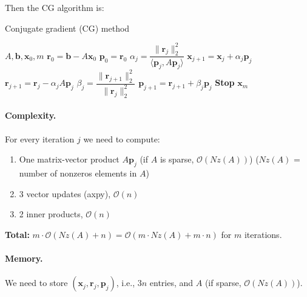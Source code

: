 Then the CG algorithm is:
\begin{algorithm}[H]
    \caption{Conjugate gradient (CG) method}
    \begin{algorithmic}[0]
        \Require $A, \mathbf{b}, \mathbf{x}_0, m$
        \State $\mathbf{r}_0 = \mathbf{b} - A\mathbf{x}_0$
        \State $\mathbf{p}_0 = \mathbf{r}_0$
        \State $\alpha_j = \dfrac{\|\mathbf{r}_j\|_2^2}{\langle \mathbf{p}_j, A \mathbf{p}_j \rangle}$
        \State $\mathbf{x}_{j+1} = \mathbf{x}_j + \alpha_j \mathbf{p}_j$
        \State $\mathbf{r}_{j+1} = \mathbf{r}_j - \alpha_j A \mathbf{p}_j$
        \State $\beta_j = \dfrac{\|\mathbf{r}_{j+1}\|_2^2}{\|\mathbf{r}_j\|_2^2}$
        \State $\mathbf{p}_{j+1} = \mathbf{r}_{j+1} + \beta_j \mathbf{p}_j$
         \textbf{Stop}
        \EndIf
        \EndFor
        \Return $\mathbf{x}_m$
    \end{algorithmic}
\end{algorithm}

\paragraph{Complexity.}
For every iteration $j$ we need to compute:
\begin{enumerate}
    \item One matrix-vector product $A\mathbf{p}_j$ (if $A$ is sparse, $\mathcal{O}(Nz(A))$) ($Nz(A)$ = number of nonzeros elements in $A$)
    \item 3 vector updates (axpy), $\mathcal{O}(n)$
    \item 2 inner products, $\mathcal{O}(n)$
\end{enumerate}
\textbf{Total:} $m\cdot \mathcal{O}(Nz(A) + n) = \mathcal{O}(m \cdot Nz(A) + m \cdot n)$ for $m$ iterations.
\paragraph{Memory.}
We need to store $(\mathbf{x}_j, \mathbf{r}_j, \mathbf{p}_j)$, i.e., $3n$ entries, and $A$ (if sparse, $\mathcal{O}(Nz(A))$).

